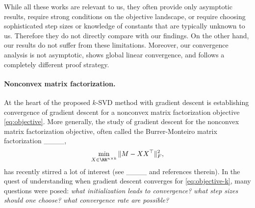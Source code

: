 While all these works are relevant to us, they often provide only asymptotic results, require strong conditions on the objective landscape, or require choosing sophisticated step sizes or knowledge of constants that are typically unknown to us. Therefore they do not directly compare with our findings. On the other hand, our results do not suffer from these limitations. Moreover, our convergence analysis is not asymptotic, shows global linear convergence, and follows a completely different proof strategy.  


\paragraph{Nonconvex matrix factorization.} At the heart of the proposed $k$-SVD method with gradient descent is establishing convergence of gradient descent for a nonconvex matrix factorization objective \eqref{eq:objective}. More generally, the study of gradient descent for  the nonconvex matrix factorization objective, often called the Burrer-Monteiro matrix factorization ____,      
\begin{align}\label{eq:objective-k}
        \min_{X \in \RR^{n \times k}}  \Vert M - XX^\top \Vert_F^2,  
\end{align} 
has recently stirred a lot of interest (see ____ and references therein). In the quest of understanding when gradient descent converges for \eqref{eq:objective-k}, many questions were posed: \emph{what initialization leads to convergence?} \emph{what step sizes should one choose?} \emph{what convergence rate are possible?} 

